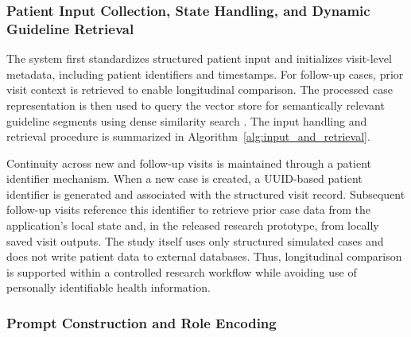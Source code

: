 \documentclass[preprint,12pt]{elsarticle}
\begin{document}
\subsubsection[]{Patient Input Collection, State Handling, and Dynamic Guideline Retrieval}

The system first standardizes structured patient input and initializes visit-level metadata, including patient identifiers and timestamps. For follow-up cases, prior visit context is retrieved to enable longitudinal comparison. The processed case representation is then used to query the vector store for semantically relevant guideline segments using dense similarity search \cite{r6}. The input handling and retrieval procedure is summarized in Algorithm~\ref{alg:input_and_retrieval}.

Continuity across new and follow-up visits is maintained through a patient identifier mechanism. When a new case is created, a UUID-based patient identifier is generated and associated with the structured visit record. Subsequent follow-up visits reference this identifier to retrieve prior case data from the application's local state and, in the released research prototype, from locally saved visit outputs. The study itself uses only structured simulated cases and does not write patient data to external databases. Thus, longitudinal comparison is supported within a controlled research workflow while avoiding use of personally identifiable health information.




\begin{algorithm}[!ht]
\caption{Prompt Construction and Role Encoding}
\label{alg:prompt_construction}
\SetAlgoLined
{}
\end{algorithm}


\subsubsection[]{Prompt Construction and Role Encoding}
\end{document}
